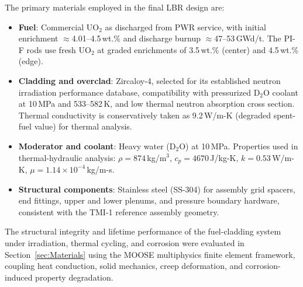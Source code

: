 The primary materials employed in the final LBR design are:

\begin{itemize}
    \item \textbf{Fuel}: Commercial UO$_2$ as discharged from PWR service,
    with initial enrichment $\approx$4.01--4.5\,wt.\% and discharge burnup
    $\approx$47--53\,GWd/t. The PI-F rods use fresh UO$_2$ at graded
    enrichments of 3.5\,wt.\% (center) and 4.5\,wt.\% (edge).

    \item \textbf{Cladding and overclad}: Zircaloy-4, selected for its
    established neutron irradiation performance database, compatibility with
    pressurized D$_2$O coolant at 10\,MPa and 533--582\,K, and low thermal
    neutron absorption cross section. Thermal conductivity is conservatively
    taken as 9.2\,W/m-K (degraded spent-fuel value) for thermal analysis.

    \item \textbf{Moderator and coolant}: Heavy water (D$_2$O) at 10\,MPa.
    Properties used in thermal-hydraulic analysis: $\rho = 874$\,kg/m$^3$,
    $c_p = 4670$\,J/kg-K, $k = 0.53$\,W/m-K, $\mu = 1.14\times10^{-4}$\,kg/m-s.

    \item \textbf{Structural components}: Stainless steel (SS-304) for
    assembly grid spacers, end fittings, upper and lower plenums, and pressure
    boundary hardware, consistent with the TMI-1 reference assembly geometry.
\end{itemize}

The structural integrity and lifetime performance of the fuel-cladding system
under irradiation, thermal cycling, and corrosion were evaluated in
Section~\ref{sec:Materials} using the MOOSE multiphysics finite element
framework, coupling heat conduction, solid mechanics, creep deformation, and
corrosion-induced property degradation.

